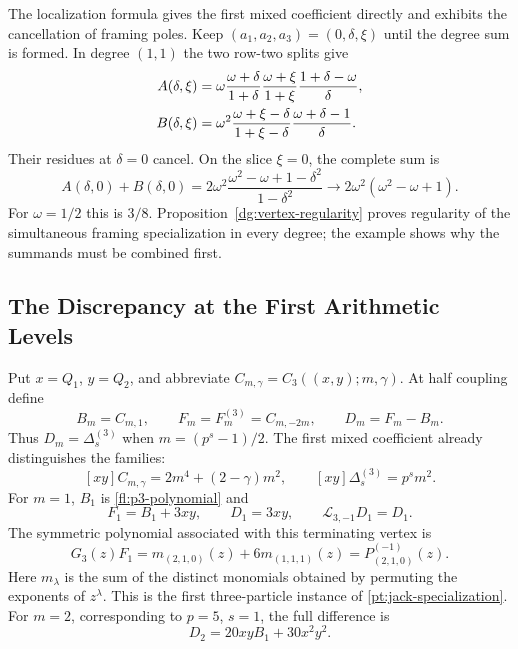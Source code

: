\documentclass[11pt]{amsart}
\theoremstyle{definition}
\theoremstyle{remark}
\numberwithin{equation}{section}
\begin{document}
The localization formula gives the first mixed coefficient
directly and exhibits the cancellation of framing poles. Keep $(a_1,a_2,a_3)=(0,\delta,\xi)$ until the degree
sum is formed. In degree $(1,1)$ the two row-two splits give
\begin{align}
 A(\delta,\xi)&=
 \omega\frac{\omega+\delta}{1+\delta}
 \frac{\omega+\xi}{1+\xi}
 \frac{1+\delta-\omega}{\delta},\notag\\
 B(\delta,\xi)&=
 \omega^2\frac{\omega+\xi-\delta}{1+\xi-\delta}
 \frac{\omega+\delta-1}{\delta}.
 \label{fl:mixed-localization-terms}
\end{align}
Their residues at $\delta=0$ cancel. On the slice $\xi=0$,
the complete sum is
\begin{equation}\label{fl:mixed-localization-cancellation}
 A(\delta,0)+B(\delta,0)
 =2\omega^2\frac{\omega^2-\omega+1-\delta^2}{1-\delta^2}
 \longrightarrow2\omega^2(\omega^2-\omega+1).
\end{equation}
For $\omega=1/2$ this is $3/8$.
Proposition~\ref{dg:vertex-regularity} proves regularity of the
simultaneous framing specialization in every degree; the example
shows why the summands must be combined first.

\subsection{The Discrepancy at the First Arithmetic Levels}
Put $x=Q_1$, $y=Q_2$, and abbreviate
$C_{m,\gamma}=C_3((x,y);m,\gamma)$.
At half coupling define
\[
 B_m=C_{m,1},\qquad F_m=F_m^{(3)}=C_{m,-2m},\qquad
 D_m=F_m-B_m.
\]
Thus $D_m=\Delta_s^{(3)}$ when $m=(p^s-1)/2$.
The first mixed coefficient already distinguishes the families:
\begin{equation}\label{pt:first-difference}
 [xy]C_{m,\gamma}=2m^4+(2-\gamma)m^2,\qquad
 [xy]\Delta_s^{(3)}=p^sm^2.
\end{equation}
For $m=1$, $B_1$ is \eqref{fl:p3-polynomial} and
\begin{equation}\label{pt:first-polynomials}
 F_1=B_1+3xy,\qquad D_1=3xy,\qquad
 \mathcal L_{3,-1}D_1=D_1.
\end{equation}
The symmetric polynomial associated with this terminating vertex is
\[
 G_3(z)F_1=m_{(2,1,0)}(z)+6m_{(1,1,1)}(z)
 =P_{(2,1,0)}^{(-1)}(z).
\]
Here $m_\lambda$ is the sum of the distinct monomials obtained
by permuting the exponents of $z^\lambda$. This is the first
three-particle instance of \eqref{pt:jack-specialization}.
For $m=2$, corresponding to $p=5$, $s=1$, the full difference is
\begin{equation}\label{pt:second-polynomials}
 D_2=20xyB_1+30x^2y^2.
\end{equation}
\end{document}
